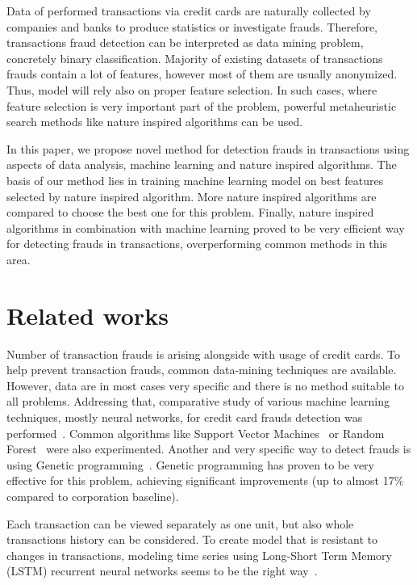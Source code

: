 \documentclass[runningheads]{llncs}
\begin{document}
Data of performed transactions via credit cards are naturally collected by companies and banks to produce statistics or investigate frauds. Therefore, transactions fraud detection can be interpreted as data mining problem, concretely binary classification. Majority of existing datasets of transactions frauds contain a lot of features, however most of them are usually anonymized. Thus, model will rely also on proper feature selection. In such cases, where feature selection is very important part of the problem, powerful metaheuristic search methods like nature inspired algorithms can be used.

In this paper, we propose novel method for detection frauds in transactions using aspects of data analysis, machine learning and nature inspired algorithms. The basis of our method lies in training machine learning model on best features selected by nature inspired algorithm. More nature inspired algorithms are compared to choose the best one for this problem. Finally, nature inspired algorithms in combination with machine learning proved to be very efficient way for detecting frauds in transactions, overperforming common methods in this area.


\section{Related works}

Number of transaction frauds is arising alongside with usage of credit cards. To help prevent transaction frauds, common data-mining techniques are available. However, data are in most cases very specific and there is no method suitable to all problems. Addressing that, comparative study of various machine learning techniques, mostly neural networks, for credit card frauds detection was performed~\cite{Sadgali2019}. Common algorithms like Support Vector Machines~\cite{Wiese2009} or Random Forest~\cite{Xuan2018} were also experimented. Another and very specific way to detect frauds is using Genetic programming~\cite{Assis2013}. Genetic programming has proven to be very effective for this problem, achieving significant improvements (up to almost 17\% compared to corporation baseline).

Each transaction can be viewed separately as one unit, but also whole transactions history can be considered. To create model that is resistant to changes in transactions, modeling time series using Long-Short Term Memory (LSTM) recurrent neural networks seems to be the right way~\cite{Wiese2009}.
\end{document}
